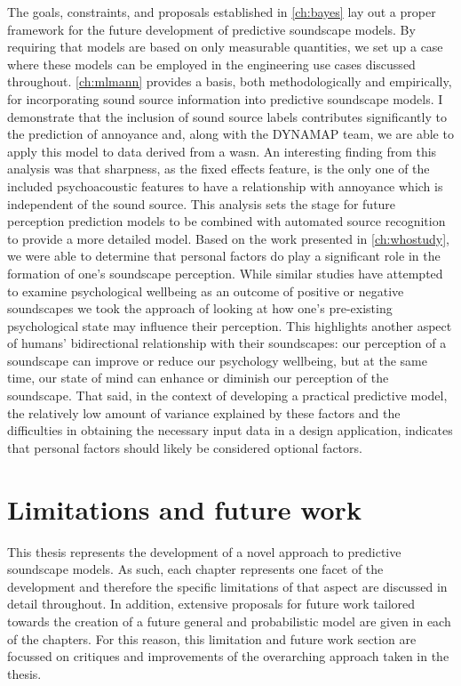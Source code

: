 The goals, constraints, and proposals established in \cref{ch:bayes} lay out a proper framework for the future development of predictive soundscape models. By requiring that models are based on only measurable quantities, we set up a case where these models can be employed in the engineering use cases discussed throughout. \cref{ch:mlmann} provides a basis, both methodologically and empirically, for incorporating sound source information into predictive soundscape models. I demonstrate that the inclusion of sound source labels contributes significantly to the prediction of annoyance and, along with the DYNAMAP team, we are able to apply this model to data derived from a \gls{wasn}. An interesting finding from this analysis was that sharpness, as the fixed effects feature, is the only one of the included psychoacoustic features to have a relationship with annoyance which is independent of the sound source. This analysis sets the stage for future perception prediction models to be combined with automated source recognition to provide a more detailed model. Based on the work presented in \cref{ch:whostudy}, we were able to determine that personal factors do play a significant role in the formation of one's soundscape perception. While similar studies have attempted to examine psychological wellbeing as an outcome of positive or negative soundscapes \citep{Tarlao2020Investigating,Aletta2018Associations} we took the approach of looking at how one's pre-existing psychological state may influence their perception. This highlights another aspect of humans' bidirectional relationship with their soundscapes: our perception of a soundscape can improve or reduce our psychology wellbeing, but at the same time, our state of mind can enhance or diminish our perception of the soundscape. That said, in the context of developing a practical predictive model, the relatively low amount of variance explained by these factors and the difficulties in obtaining the necessary input data in a design application, indicates that personal factors should likely be considered optional factors.

\section{Limitations and future work}

This thesis represents the development of a novel approach to predictive soundscape models. As such, each chapter represents one facet of the development and therefore the specific limitations of that aspect are discussed in detail throughout. In addition, extensive proposals for future work tailored towards the creation of a future general and probabilistic model are given in each of the chapters. For this reason, this limitation and future work section are focussed on critiques and improvements of the overarching approach taken in the thesis.

